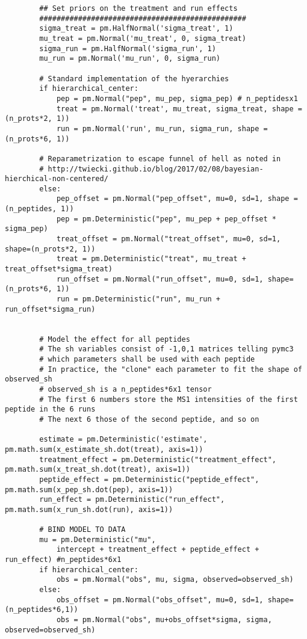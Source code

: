\documentclass[a4paper]{article}
\begin{document}
\begin{verbatim}
        ## Set priors on the treatment and run effects
        ################################################    
        sigma_treat = pm.HalfNormal('sigma_treat', 1)
        mu_treat = pm.Normal('mu_treat', 0, sigma_treat)
        sigma_run = pm.HalfNormal('sigma_run', 1)
        mu_run = pm.Normal('mu_run', 0, sigma_run)

        # Standard implementation of the hyerarchies
        if hierarchical_center:
            pep = pm.Normal("pep", mu_pep, sigma_pep) # n_peptidesx1
            treat = pm.Normal('treat', mu_treat, sigma_treat, shape = (n_prots*2, 1))
            run = pm.Normal('run', mu_run, sigma_run, shape = (n_prots*6, 1))

        # Reparametrization to escape funnel of hell as noted in
        # http://twiecki.github.io/blog/2017/02/08/bayesian-hierchical-non-centered/
        else:
            pep_offset = pm.Normal("pep_offset", mu=0, sd=1, shape = (n_peptides, 1))
            pep = pm.Deterministic("pep", mu_pep + pep_offset * sigma_pep)
            treat_offset = pm.Normal("treat_offset", mu=0, sd=1, shape=(n_prots*2, 1))
            treat = pm.Deterministic("treat", mu_treat + treat_offset*sigma_treat)
            run_offset = pm.Normal("run_offset", mu=0, sd=1, shape=(n_prots*6, 1))
            run = pm.Deterministic("run", mu_run + run_offset*sigma_run)


        # Model the effect for all peptides
        # The sh variables consist of -1,0,1 matrices telling pymc3
        # which parameters shall be used with each peptide
        # In practice, the "clone" each parameter to fit the shape of observed_sh
        # observed_sh is a n_peptides*6x1 tensor
        # The first 6 numbers store the MS1 intensities of the first peptide in the 6 runs
        # The next 6 those of the second peptide, and so on

        estimate = pm.Deterministic('estimate', pm.math.sum(x_estimate_sh.dot(treat), axis=1))
        treatment_effect = pm.Deterministic("treatment_effect", pm.math.sum(x_treat_sh.dot(treat), axis=1))
        peptide_effect = pm.Deterministic("peptide_effect", pm.math.sum(x_pep_sh.dot(pep), axis=1))
        run_effect = pm.Deterministic("run_effect", pm.math.sum(x_run_sh.dot(run), axis=1))

        # BIND MODEL TO DATA
        mu = pm.Deterministic("mu", 
            intercept + treatment_effect + peptide_effect + run_effect) #n_peptides*6x1
        if hierarchical_center:
            obs = pm.Normal("obs", mu, sigma, observed=observed_sh)
        else:
            obs_offset = pm.Normal("obs_offset", mu=0, sd=1, shape=(n_peptides*6,1))
            obs = pm.Normal("obs", mu+obs_offset*sigma, sigma, observed=observed_sh)



\end{verbatim}
\end{document}
